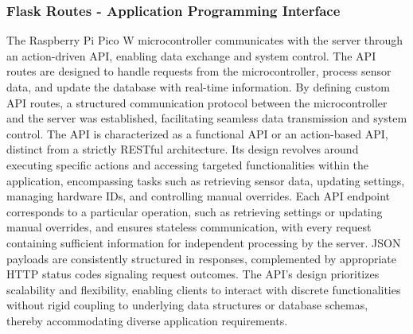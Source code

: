 \documentclass[12pt]{article} %
\begin{document}
\subsubsection{Flask Routes - Application Programming Interface}
\noindent The Raspberry Pi Pico W microcontroller communicates with the server through an action-driven API, enabling data exchange and system control. The API routes are designed to handle requests from the microcontroller, process sensor data, and update the database with real-time information. By defining custom API routes, a structured communication protocol between the microcontroller and the server was established, facilitating seamless data transmission and system control.
\newline
\newline
\noindent The API is characterized as a functional API or an action-based API, distinct from a strictly RESTful architecture. Its design revolves around executing specific actions and accessing targeted functionalities within the application, encompassing tasks such as retrieving sensor data, updating settings, managing hardware IDs, and controlling manual overrides. Each API endpoint corresponds to a particular operation, such as retrieving settings or updating manual overrides, and ensures stateless communication, with every request containing sufficient information for independent processing by the server. JSON payloads are consistently structured in responses, complemented by appropriate HTTP status codes signaling request outcomes. The API's design prioritizes scalability and flexibility, enabling clients to interact with discrete functionalities without rigid coupling to underlying data structures or database schemas, thereby accommodating diverse application requirements.
\newline
\newline
\end{document}
